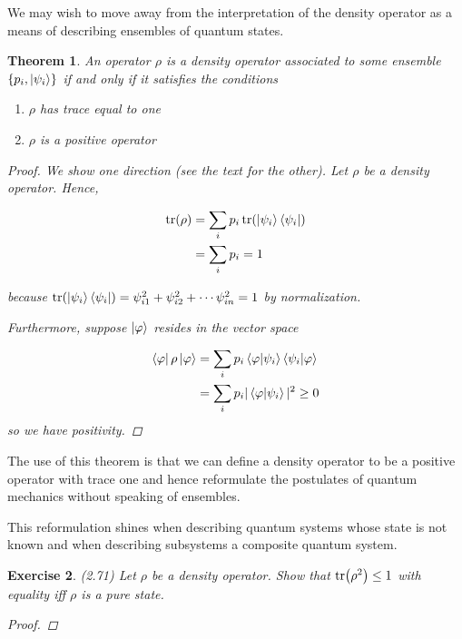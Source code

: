 \documentclass[11pt]{article}
\newcommand\0{\mathbf{0}}
\newcommand\<{\langle}
\renewcommand\>{\rangle}
\renewcommand\phi{\varphi}
\newtheorem{theorem}{Theorem}[section]
\newtheorem{exercise}[theorem]{Exercise}
\begin{document}
We may wish to move away from the interpretation of the density operator as a means of describing ensembles of quantum states.

\begin{theorem}
An operator $\rho$ is a density operator associated to some ensemble $\{p_i, \ket{\psi_i}\}$ if and only if it satisfies the conditions

\begin{enumerate}
\item $\rho$ has trace equal to one
\item $\rho$ is a positive operator	
\end{enumerate}

\begin{proof}
	We show one direction (see the text for the other). Let $\rho$ be a density operator. Hence,
	
	\begin{align*}
	\tr(\rho) &= \sum_i p_i \tr(\ket{\psi_i}\bra{\psi_i}) \\
	&= 	\sum_i p_i =1
	\end{align*}

because $\tr(\ket{\psi_i}\bra{\psi_i}) = \psi_{i1}^2 + \psi_{i2}^2 + \cdots \psi_{in}^2 = 1$ by normalization. 

Furthermore, suppose $\ket{\phi}$ resides in the vector space

\begin{align*}
\bra{\phi} \rho \ket{\phi} &= \sum_i p_i \bra{\phi}\ket{\psi_i}\bra{\psi_i}\ket{\phi} \\
&= \sum_i p_i |\bra{\phi}\ket{\psi_i}|^2 \geq 0
\end{align*}
so we have positivity.
\end{proof}	
\end{theorem}

The use of this theorem is that we can define a density operator to be a positive operator with trace one and hence reformulate the postulates of quantum mechanics without speaking of ensembles.

This reformulation shines when describing quantum systems whose state is not known and when describing subsystems a composite quantum system.

\begin{exercise}
(2.71) Let $\rho$ be a density operator. Show that $\tr(\rho^2) \leq 1$ with equality iff $\rho$ is a pure state.
\begin{proof}
\end{proof}	
\end{exercise}
\end{document}
